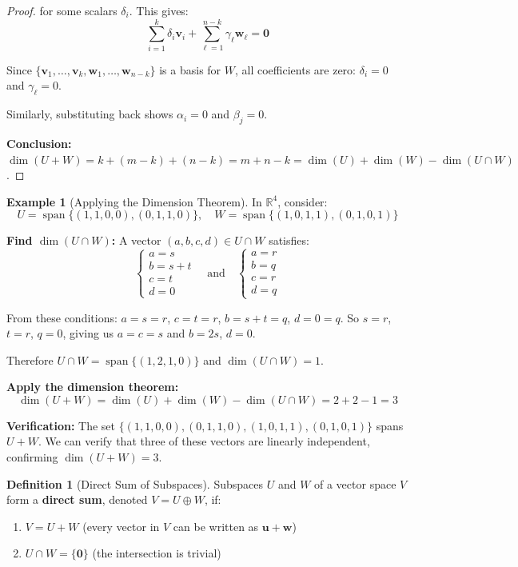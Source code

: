 \documentclass[12pt]{article}
\numberwithin{equation}{section}
\newcommand{\vect}[1]{\boldsymbol{#1}}   %
\newcommand{\Span}{\operatorname{span}}
\theoremstyle{plain}
\theoremstyle{definition}
\newtheorem{definition}[theorem]{Definition}
\newtheorem{example}[theorem]{Example}
\theoremstyle{remark}
\begin{document}
\begin{proof}
for some scalars $\delta_i$. This gives:
$$\sum_{i=1}^k \delta_i\vect{v}_i + \sum_{\ell=1}^{n-k} \gamma_\ell\vect{w}_\ell = \vect{0}$$

Since $\{\vect{v}_1, \ldots, \vect{v}_k, \vect{w}_1, \ldots, \vect{w}_{n-k}\}$ is a basis for $W$, all coefficients are zero: $\delta_i = 0$ and $\gamma_\ell = 0$.

Similarly, substituting back shows $\alpha_i = 0$ and $\beta_j = 0$.

\textbf{Conclusion:} $\dim(U + W) = k + (m-k) + (n-k) = m + n - k = \dim(U) + \dim(W) - \dim(U \cap W)$.
\end{proof}

\begin{example}[Applying the Dimension Theorem]
In $\mathbb{R}^4$, consider:
$$U = \Span\{(1,1,0,0), (0,1,1,0)\}, \quad W = \Span\{(1,0,1,1), (0,1,0,1)\}$$

\textbf{Find $\dim(U \cap W)$:}
A vector $(a,b,c,d) \in U \cap W$ satisfies:
$$\begin{cases}
a = s \\
b = s + t \\
c = t \\
d = 0
\end{cases} \quad \text{and} \quad \begin{cases}
a = r \\
b = q \\
c = r \\
d = q
\end{cases}$$

From these conditions: $a = s = r$, $c = t = r$, $b = s + t = q$, $d = 0 = q$.
So $s = r$, $t = r$, $q = 0$, giving us $a = c = s$ and $b = 2s$, $d = 0$.

Therefore $U \cap W = \Span\{(1,2,1,0)\}$ and $\dim(U \cap W) = 1$.

\textbf{Apply the dimension theorem:}
$$\dim(U + W) = \dim(U) + \dim(W) - \dim(U \cap W) = 2 + 2 - 1 = 3$$

\textbf{Verification:} The set $\{(1,1,0,0), (0,1,1,0), (1,0,1,1), (0,1,0,1)\}$ spans $U + W$. We can verify that three of these vectors are linearly independent, confirming $\dim(U + W) = 3$.
\end{example}

\begin{definition}[Direct Sum of Subspaces]
Subspaces $U$ and $W$ of a vector space $V$ form a \textbf{direct sum}, denoted $V = U \oplus W$, if:
\begin{enumerate}
\item $V = U + W$ (every vector in $V$ can be written as $\vect{u} + \vect{w}$)
\item $U \cap W = \{\vect{0}\}$ (the intersection is trivial)
\end{enumerate}
\end{definition}
\end{document}
